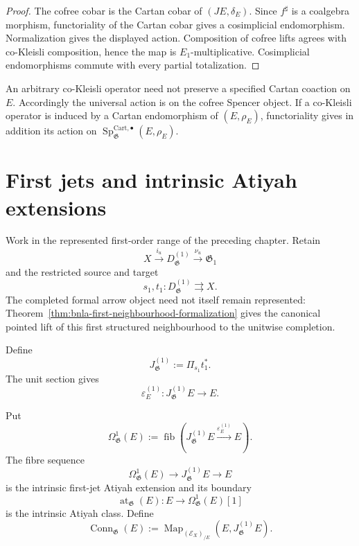 \begin{proof}
The cofree cobar is the Cartan cobar of $(JE,\delta_E)$.  Since
$f^\sharp$ is a coalgebra morphism, functoriality of the Cartan cobar gives a
cosimplicial endomorphism.  Normalization gives the displayed action.
Composition of cofree lifts agrees with co-Kleisli composition, hence the map
is $E_1$-multiplicative.  Cosimplicial endomorphisms commute with every
partial totalization.
\end{proof}

\begin{remark}
An arbitrary co-Kleisli operator need not preserve a specified Cartan
coaction on $E$.  Accordingly the universal action is on the cofree Spencer
object.  If a co-Kleisli operator is induced by a Cartan endomorphism of
$(E,\rho_E)$, functoriality gives in addition its action on
$\operatorname{Sp}^{\mathrm{Cart},\bullet}_{\mathfrak G}(E,\rho_E)$.
\end{remark}


\section{First jets and intrinsic Atiyah extensions}
\label{sec:as-atiyah-extensions}

Work in the represented first-order range of the preceding chapter.  Retain
\[
    X\xrightarrow{i_u}D^{(1)}_{\mathfrak G}
    \xrightarrow{\nu_u}\mathfrak G_1
\]
and the restricted source and target
\[
    s_1,t_1:D^{(1)}_{\mathfrak G}\rightrightarrows X.
\]
The completed formal arrow object need not itself remain represented:
Theorem~\ref{thm:bnla-first-neighbourhood-formalization} gives the canonical
pointed lift of this first structured neighbourhood to the unitwise
completion.

\begin{definition}
\label{def:as-first-jet}
Define
\[
    J^{(1)}_{\mathfrak G}:=\Pi_{s_1}t_1^*.
\]
The unit section gives
\[
    \varepsilon_E^{(1)}:
    J^{(1)}_{\mathfrak G}E\longrightarrow E.
\]
\end{definition}

\begin{definition}
\label{def:as-atiyah-extension}
Put
\[
    \Omega^1_{\mathfrak G}(E)
    :=
    \operatorname{fib}
    \left(
        J^{(1)}_{\mathfrak G}E
        \xrightarrow{\varepsilon_E^{(1)}}E
    \right).
\]
The fibre sequence
\[
\boxed{
    \Omega^1_{\mathfrak G}(E)
    \longrightarrow
    J^{(1)}_{\mathfrak G}E
    \longrightarrow
    E
}
\]
is the intrinsic first-jet Atiyah extension and its boundary
\[
    \operatorname{at}_{\mathfrak G}(E):
    E\longrightarrow\Omega^1_{\mathfrak G}(E)[1]
\]
is the intrinsic Atiyah class.  Define
\[
\boxed{
    \operatorname{Conn}_{\mathfrak G}(E)
    :=
    \operatorname{Map}_{(\mathcal E_X)_{/E}}
    \left(E,J^{(1)}_{\mathfrak G}E\right).
}
\]
\end{definition}

